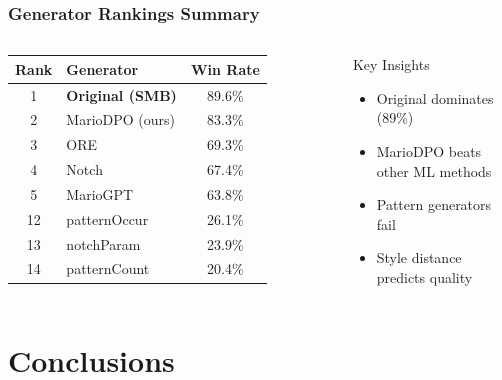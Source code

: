 \documentclass{beamer}
\begin{document}
\begin{frame}
\frametitle{Generator Rankings Summary}

\begin{columns}
\begin{table}
\centering
\footnotesize
\begin{tabular}{clc}
\toprule
\textbf{Rank} & \textbf{Generator} & \textbf{Win Rate} \\
\midrule
1 & \textbf{Original (SMB)} & 89.6\% \\
2 & \alert{MarioDPO (ours)} & \alert{83.3\%} \\
3 & ORE & 69.3\% \\
4 & Notch & 67.4\% \\
5 & MarioGPT & 63.8\% \\
\midrule
12 & patternOccur & 26.1\% \\
13 & notchParam & 23.9\% \\
14 & patternCount & 20.4\% \\
\bottomrule
\end{tabular}
\end{table}

\begin{block}{Key Insights}
\begin{itemize}
    \item Original dominates (89\%)
    \item \alert{MarioDPO} beats other ML methods
    \item Pattern generators fail
    \item Style distance predicts quality
\end{itemize}
\end{block}
\end{columns}

\end{frame}

\section{Conclusions}
\end{document}
